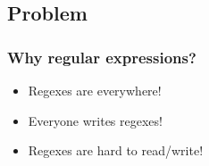 
\subsection{Problem}
\begin{frame}
\frametitle{Why regular expressions?}

\begin{itemize}
\item<2-> Regexes are everywhere! 
\item<3-> Everyone writes regexes! 
\item<4-> Regexes are hard to read/write! 
\end{itemize}
%
%
%
%

\end{frame}



